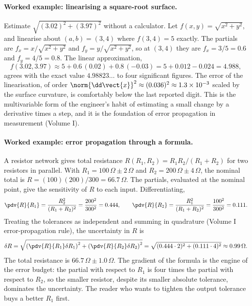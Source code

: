 

\paragraph{Worked example: linearising a square-root surface.}
Estimate $\sqrt{(3.02)^{2} + (3.97)^{2}}$ without a calculator. Let
$f(x, y) = \sqrt{x^{2} + y^{2}}$, and linearise about $(a, b) =
(3, 4)$ where $f(3, 4) = 5$ exactly. The partials are $f_{x} =
x/\sqrt{x^{2} + y^{2}}$ and $f_{y} = y/\sqrt{x^{2} + y^{2}}$, so at
$(3, 4)$ they are $f_{x} = 3/5 = 0.6$ and $f_{y} = 4/5 = 0.8$. The
linear approximation,
\[
f(3.02, 3.97) \approx 5 + 0.6\,(0.02) + 0.8\,(-0.03)
= 5 + 0.012 - 0.024 = 4.988,
\]
agrees with the exact value $4.98823\ldots$ to four significant
figures. The error of the linearisation, of order $\norm{\dd\vect{x}}
^{2} \approx (0.036)^{2} \approx 1.3 \times 10^{-3}$ scaled by the
surface curvature, is comfortably below the last reported digit.
This is the multivariable form of the engineer's habit of
estimating a small change by a derivative times a step, and it is
the foundation of error propagation in measurement (Volume I).

\paragraph{Worked example: error propagation through a formula.} A
resistor network gives total resistance $R(R_{1}, R_{2}) = R_{1}
R_{2} / (R_{1} + R_{2})$ for two resistors in parallel. With $R_{1}
= 100\,\Omega \pm 2\,\Omega$ and $R_{2} = 200\,\Omega \pm
4\,\Omega$, the nominal total is $R = (100)(200)/300 = 66.7\,\Omega$.
The partials, evaluated at the nominal point, give the sensitivity
of $R$ to each input. Differentiating,
\[
\pdv{R}{R_{1}} = \frac{R_{2}^{2}}{(R_{1} + R_{2})^{2}}
= \frac{200^{2}}{300^{2}} = 0.444, \qquad
\pdv{R}{R_{2}} = \frac{R_{1}^{2}}{(R_{1} + R_{2})^{2}}
= \frac{100^{2}}{300^{2}} = 0.111.
\]
Treating the tolerances as independent and summing in quadrature
(Volume I error-propagation rule), the uncertainty in $R$ is
\[
\delta R = \sqrt{\left(\pdv{R}{R_{1}}\delta R_{1}\right)^{2}
+ \left(\pdv{R}{R_{2}}\delta R_{2}\right)^{2}}
= \sqrt{(0.444 \cdot 2)^{2} + (0.111 \cdot 4)^{2}}
\approx 0.99\,\Omega.
\]
The total resistance is $66.7\,\Omega \pm 1.0\,\Omega$. The gradient
of the formula is the engine of the error budget: the partial with
respect to $R_{1}$ is four times the partial with respect to $R_{2}$,
so the smaller resistor, despite its smaller absolute tolerance,
dominates the uncertainty. The reader who wants to tighten the
output tolerance buys a better $R_{1}$ first.

